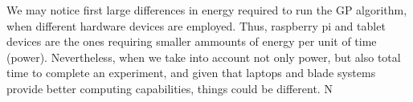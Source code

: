 We may notice first large differences in energy required to run the GP algorithm, when different hardware devices are employed.  Thus, raspberry pi and tablet devices are the ones requiring smaller ammounts of energy per unit of time (power).  Nevertheless, when we take into account not only power, but also total time to complete an experiment, and given that laptops and blade systems provide better computing capabilities, things could be different.  N









